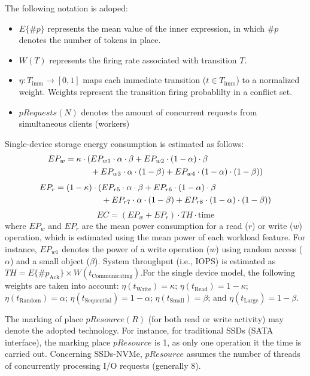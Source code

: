 The following notation is adoped:
\begin{itemize}
    \item $E\{\#p\}$ represents the mean value of the inner expression, in which $\#p$ denotes the number of tokens in place.
    \item $W(T)$ represents the firing rate associated with transition $T$.
    \item $\eta : T_{\text{imm}} \rightarrow [0, 1]$ maps each immediate transition ($t \in T_{\text{imm}}$) to a normalized weight. Weights represent the transition firing probablilty in a conflict set.
    \item $pRequests(N)$ denotes the amount of concurrent requests from simultaneous clients (workers)
\end{itemize}

Single-device storage energy consumption is estimated as follows:
\begin{align}
    EP_w = \kappa \cdot (&EP_{w1} \cdot \alpha \cdot \beta 
        + EP_{w2} \cdot (1 - \alpha) \cdot \beta \notag \\
        &+ EP_{w3} \cdot \alpha \cdot (1 - \beta) 
        + EP_{w4} \cdot (1 - \alpha) \cdot (1 - \beta))
\end{align}
\begin{align}
    EP_r = (1 - \kappa) \cdot (&EP_{r5} \cdot \alpha \cdot \beta 
        + EP_{r6} \cdot (1 - \alpha) \cdot \beta \notag \\
        &+ EP_{r7} \cdot \alpha \cdot (1 - \beta) 
        + EP_{r8} \cdot (1 - \alpha) \cdot (1 - \beta))
\end{align}
\begin{equation}
    EC = (EP_w + EP_r) \cdot TH \cdot \text{time}
\end{equation}
where $EP_w$ and $EP_r$ are the mean power consumption for a read ($r$) or write ($w$) operation, which is estimated using the mean power of each workload feature. For instance, $EP_{w1}$ denotes the power of a write operation ($w$) using random access ($\alpha$) and a small object ($\beta$). System throughput (i.e., IOPS) is estimated as $TH = E\{\#p_{\text{Ack}}\} \times W(t_{\text{Communicating}})$.For the single device model, the following weights are taken into account:
$\eta(t_{\text{Write}}) = \kappa$;  
$\eta(t_{\text{Read}}) = 1 - \kappa$;  
$\eta(t_{\text{Random}}) = \alpha$;  
$\eta(t_{\text{Sequential}}) = 1 - \alpha$;  
$\eta(t_{\text{Small}}) = \beta$; and  
$\eta(t_{\text{Large}}) = 1 - \beta$.

The marking of place $pResource (R)$ (for both read or write activity) may denote the adopted technology. For instance, for traditional SSDs (SATA interface), the marking place $pResource$ is 1, as only one operation it the time is carried out. Concerning SSDs-NVMe, $pResource$ assumes the number of threads of concurrently processing I/O requests (generally 8).

